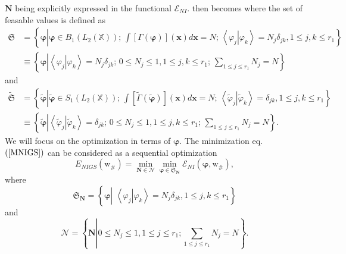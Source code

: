 \documentclass[aps,preprint]{revtex4}%
\begin{document}
$\mathbf{N}$ being explicitly expressed in the functional $\mathcal{E}_{NI}.$
then becomes where the set of feasable values is defined as
\begin{align}
\mathfrak{S}  &  =\left\{  \mathbf{\varphi}\left\vert \mathbf{\varphi\in}%
B_{1}\left(  L_{2}\left(  \mathbb{X}\right)  \right)  ;\,\int\left[
\Gamma\left(  \mathbf{\varphi}\right)  \right]  \left(  \mathbf{x}\right)
d\mathbf{x}=N;\,\left\langle \left.  \varphi_{j}\right\vert \varphi
_{k}\right\rangle =N_{j}\delta_{jk},1\leq j,k\leq r_{1}\right.  \right\}
\nonumber\\
&  \equiv\left\{  \mathbf{\varphi}\left\vert \left\langle \left.  \varphi
_{j}\right\vert \varphi_{k}\right\rangle =N_{j}\delta_{jk};\,0\leq N_{j}%
\leq1,1\leq j,k\leq r_{1};\,\sum_{1\leq j\leq r_{1}}N_{j}=N\right.  \right\}
\end{align}
and
\begin{align}
\mathfrak{\tilde{S}}  &  =\left\{  \mathbf{\tilde{\varphi}}\left\vert
\mathbf{\tilde{\varphi}\in}S_{1}\left(  L_{2}\left(  \mathbb{X}\right)
\right)  ;\,\int\left[  \tilde{\Gamma}\left(  \mathbf{\tilde{\varphi}}\right)
\right]  \left(  \mathbf{x}\right)  d\mathbf{x}=N;\,\left\langle \left.
\tilde{\varphi}_{j}\right\vert \tilde{\varphi}_{k}\right\rangle =\delta
_{jk},1\leq j,k\leq r_{1}\right.  \right\} \nonumber\\
&  \equiv\left\{  \mathbf{\tilde{\varphi}}\left\vert \left\langle \left.
\tilde{\varphi}_{j}\right\vert \tilde{\varphi}_{k}\right\rangle =\delta
_{jk};\,0\leq N_{j}\leq1,1\leq j,k\leq r_{1};\,\sum_{1\leq j\leq r_{1}}%
N_{j}=N\right.  \right\}  .
\end{align}
We will focus on the optimization in terms of $\mathbf{\varphi}$. The
minimization eq. $\left(  \ref{MNIGS}\right)  $ can be considered as a
sequential optimization
\begin{equation}
E_{NIGS}\left(  \mathrm{w}_{\#}\right)  =\min_{\mathbf{N\in}\mathcal{N}}%
\min_{\mathbf{\varphi\in}\mathfrak{S}_{\mathbf{N}}}\mathcal{E}_{NI}\left(
\mathbf{\varphi,}\mathrm{w}_{\#}\right)  , \label{seqopt}%
\end{equation}
where
\begin{equation}
\mathfrak{S}_{\mathbf{N}}=\left\{  \mathbf{\varphi}\left\vert \,\,\left\langle
\left.  \varphi_{j}\right\vert \varphi_{k}\right\rangle =N_{j}\delta
_{jk},1\leq j,k\leq r_{1}\right.  \right\}
\end{equation}
and
\begin{equation}
\mathcal{N}=\left\{  \mathbf{N}\left\vert 0\leq N_{j}\leq1,1\leq j\leq
r_{1};\sum_{1\leq j\leq r_{1}}N_{j}=N\right.  \right\}  .
\end{equation}
\end{document}
